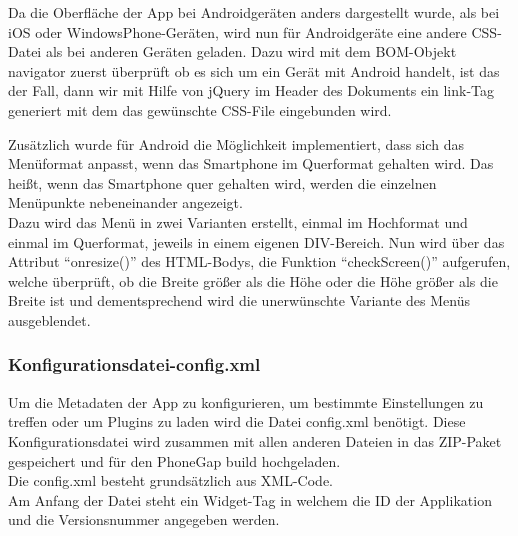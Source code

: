 Da die Oberfläche der App bei Androidgeräten anders dargestellt wurde, als bei iOS oder WindowsPhone-Geräten, wird nun für Androidgeräte eine andere CSS-Datei als bei anderen Geräten geladen. Dazu wird mit dem BOM-Objekt navigator zuerst überprüft ob es sich um ein Gerät mit Android handelt, ist das der Fall, dann wir mit Hilfe von jQuery im Header des Dokuments ein link-Tag generiert mit dem das gewünschte CSS-File eingebunden wird.

\newpage




Zusätzlich wurde für Android die Möglichkeit implementiert, dass sich das Menüformat anpasst, wenn das Smartphone im Querformat gehalten wird. Das heißt, wenn das Smartphone quer gehalten wird, werden die einzelnen Menüpunkte nebeneinander angezeigt.\\
Dazu wird das Menü in zwei Varianten erstellt, einmal im Hochformat und einmal im Querformat, jeweils in einem eigenen DIV-Bereich. Nun wird über das Attribut \enquote{onresize()} des HTML-Bodys, die Funktion \enquote{checkScreen()} aufgerufen, welche überprüft, ob die Breite größer als die Höhe oder die Höhe größer als die Breite ist  und dementsprechend wird die unerwünschte Variante des Menüs ausgeblendet.\\




\subsubsection{Konfigurationsdatei-config.xml}

Um die Metadaten der App zu konfigurieren, um bestimmte Einstellungen zu treffen oder um Plugins zu laden wird die Datei config.xml benötigt. Diese Konfigurationsdatei wird zusammen mit allen anderen Dateien in das ZIP-Paket gespeichert und für den PhoneGap build hochgeladen.\\
Die config.xml besteht grundsätzlich aus XML-Code.\\
Am Anfang der Datei steht ein Widget-Tag in welchem die ID der Applikation und die Versionsnummer angegeben werden.\\
 
